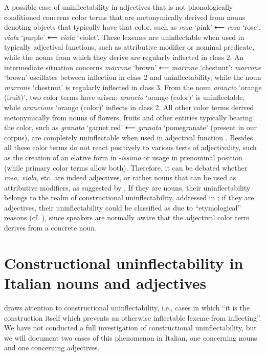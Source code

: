 \documentclass[output=paper]{langscibook}
\begin{document}
A possible case of uninflectability in adjectives that is not phonologically conditioned concerns color terms that are metonymically derived from nouns denoting objects that typically have that color, such as \textit{rosa} ‘pink’ ⟵   \textit{rosa} ‘rose’, \textit{viola} ‘purple’ ⟵   \textit{viola} ‘violet’. These lexemes are uninflectable when used in typically adjectival functions, such as attributive modifier or nominal predicate, while the nouns from which they derive are regularly inflected in class 2. An intermediate situation concerns \textit{marrone} ‘brown’ ⟵   \textit{marrone} ‘chestnut’: \textit{marrone} ‘brown’ oscillates between inflection in class 2 and uninflectability, while the noun \textit{marrone} ‘chestnut’ is regularly inflected in class 3. From the noun \textit{arancio} ‘orange (fruit)’, two color terms have arisen: \textit{arancio} ‘orange (color)’ is uninflectable, while \textit{arancione} ‘orange (color)’ inflects in class 2. All other color terms derived metonymically from nouns of flowers, fruits and other entities typically bearing the color, such as \textit{granata} ‘garnet red’ ⟵ \textit{granata} ‘pomegranate’ (present in our corpus), are completely uninflectable when used in adjectival function \citep{Thornton2004}. Besides, all these color terms do not react positively to various tests of adjectivality, such as the creation of an elative form in \nobreakdash-\textit{issimo} or usage in prenominal position (while primary color terms allow both). Therefore, it can be debated whether \textit{rosa, viola}, etc. are indeed adjectives, or rather nouns that can be used as attributive modifiers, as suggested by \citet[530]{Thornton2004}. If they are nouns, their uninflectability belongs to the realm of constructional uninflectability, addressed in ; if they are adjectives, their uninflectability could be classified as due to “etymological” reasons (cf. \citealt{Fedden2019}), since speakers are normally aware that the adjectival color term derives from a concrete noun.

\section{Constructional uninflectability in Italian nouns and adjectives}

\citet[148]{Spencer2020} draws attention to constructional uninflectability, i.e., cases in which “it is the construction itself which prevents an otherwise inflectable lexeme from inflecting”. We have not conducted a full investigation of constructional uninflectability, but we will document two cases of this phenomenon in Italian, one concerning nouns and one concerning adjectives.
\end{document}
